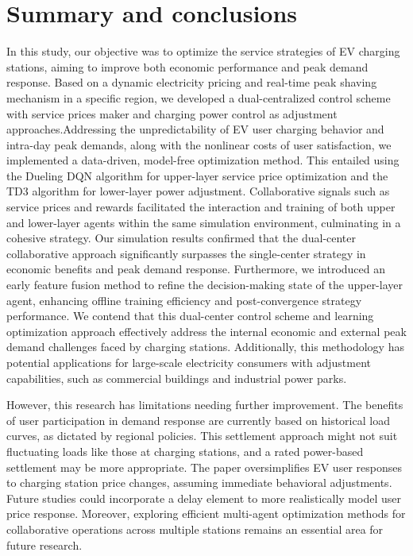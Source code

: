 \documentclass[preprint,12pt]{elsarticle}
\begin{document}
\section{Summary and conclusions}
In this study, our objective was to optimize the service strategies of EV charging stations, aiming to improve both economic performance and peak demand response. Based on a dynamic electricity pricing and real-time peak shaving mechanism in a specific region, we developed a dual-centralized control scheme with service prices maker and charging power control as adjustment approaches.Addressing the unpredictability of EV user charging behavior and intra-day peak demands, along with the nonlinear costs of user satisfaction, we implemented a data-driven, model-free optimization method. This entailed using the Dueling DQN algorithm for upper-layer service price optimization and the TD3 algorithm for lower-layer power adjustment.
Collaborative signals such as service prices and rewards facilitated the interaction and training of both upper and lower-layer agents within the same simulation environment, culminating in a cohesive strategy. Our simulation results confirmed that the dual-center collaborative approach significantly surpasses the single-center strategy in economic benefits and peak demand response. Furthermore, we introduced an early feature fusion method to refine the decision-making state of the upper-layer agent, enhancing offline training efficiency and post-convergence strategy performance. We contend that this dual-center control scheme and learning optimization approach effectively address the internal economic and external peak demand challenges faced by charging stations. Additionally, this methodology has potential applications for large-scale electricity consumers with adjustment capabilities, such as commercial buildings and industrial power parks. 

However, this research has limitations needing further improvement. The benefits of user participation in demand response are currently based on historical load curves, as dictated by regional policies. This settlement approach might not suit fluctuating loads like those at charging stations, and a rated power-based settlement may be more appropriate.  The paper oversimplifies EV user responses to charging station price changes, assuming immediate behavioral adjustments. Future studies could incorporate a delay element to more realistically model user price response. Moreover, exploring efficient multi-agent optimization methods for collaborative operations across multiple stations remains an essential area for future research.
\end{document}
